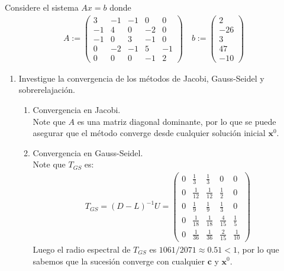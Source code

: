 \begin{homeworkProblem}
  Considere el sistema $Ax=b$ donde
  \begin{align*}
    A:=\begin{pmatrix}
      3 & -1 & -1 & 0 & 0 \\
      -1 & 4 & 0 & -2 & 0 \\
      -1 & 0 & 3 & -1 & 0 \\
      0 & -2 & -1 & 5 & -1 \\
      0 & 0 & 0 & -1 & 2
    \end{pmatrix}
    \quad b:=\begin{pmatrix}
      2 \\
      -26 \\
      3 \\
      47 \\
      -10 
    \end{pmatrix}
  \end{align*}
  \begin{enumerate}
    \item Investigue la convergencia de los métodos de Jacobi, Gauss-Seidel y sobrerelajación.
      \begin{solucion}
        \begin{enumerate}
          \item Convergencia en Jacobi.\\
            Note que $A$ es una matriz diagonal dominante, por lo que se puede asegurar que el método converge desde cualquier solución inicial $\textbf{x}^{0}$.
          \item Convergencia en Gauss-Seidel.\\
            Note que $T_{GS}$ es:
            \begin{align*}
              T_{GS}=(D-L)^{-1}U=\begin{pmatrix}
                0 & \frac{1}{3}  & \frac{1}{3}  & 0            & 0\\
                0 & \frac{1}{12} & \frac{1}{12} & \frac{1}{2}  & 0\\
                0 & \frac{1}{9}  & \frac{1}{9}  & \frac{1}{3}  & 0\\
                0 & \frac{1}{18} & \frac{1}{18} & \frac{4}{15} & \frac{1}{5}\\
                0 & \frac{1}{36} & \frac{1}{36} & \frac{2}{15} & \frac{1}{10}
              \end{pmatrix}
            \end{align*}
            Luego el radio espectral de $T_{GS}$ es $1061/2071\approx 0.51 < 1$, por lo que sabemos que la sucesión converge con cualquier $\textbf{c}$ y $\textbf{x}^0$.\\

\end{enumerate}
\end{solucion}
\end{enumerate}
\end{homeworkProblem}
